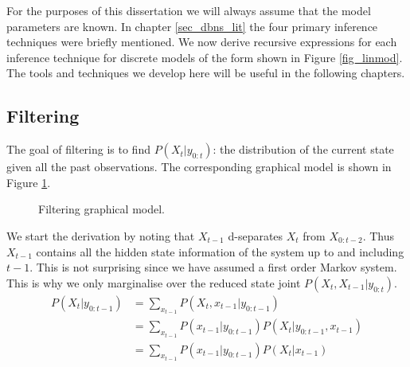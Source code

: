 For the purposes of this dissertation we will always assume that the model parameters are known. In chapter \ref{sec_dbns_lit} the four primary inference techniques were briefly mentioned. We now derive recursive expressions for each inference technique for discrete models of the form shown in Figure \ref{fig_linmod}. The tools and techniques we develop here will be useful in the following chapters. 

\subsection{Filtering}
The goal of filtering is to find $P(X_t|y_{0:t})$: the distribution of the current state given all the past observations. The corresponding graphical model is shown in Figure \ref{fig_linmod_filter_hmm}.
\begin{figure}[H] 
\centering
{}
\caption{Filtering graphical model.}
\label{fig_linmod_filter_hmm}
\end{figure}
We start the derivation by noting that $X_{t-1}$ d-separates $X_t$ from $X_{0:t-2}$. Thus $X_{t-1}$ contains all the hidden state information of the system up to and including $t-1$. This is not surprising since we have assumed a first order Markov system. This is why we only marginalise over the reduced state joint $P(X_t, X_{t-1}|y_{0:t})$.
\begin{equation}
\begin{aligned}
P(X_t| y_{0:t-1}) &= \sum_{x_{t-1}} P(X_t, x_{t-1}| y_{0:t-1})\\
&= \sum_{x_{t-1}} P(x_{t-1}|y_{0:t-1})P(X_t|y_{0:t-1}, x_{t-1})\\  
& = \sum_{x_{t-1}} P(x_{t-1}|y_{0:t-1})P(X_t|x_{t-1}) \\
\end{aligned}
\label{eq_forward_no_recur}
\end{equation}

